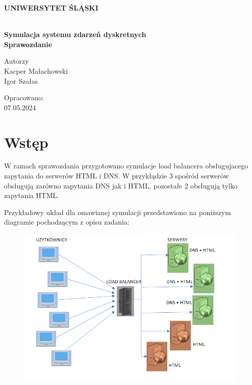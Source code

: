 \documentclass[12pt,oneside,a4paper]{book} %
\theoremstyle{break}
\begin{document}
\thispagestyle{empty}
\begin{center}
  \Large
  \bf{UNIWERSYTET ŚLĄSKI}\\
  \bf{}\\[25mm]
  \large

  \bf{Symulacja systemu zdarzeń dyskretnych}\\[35mm]

  Sprawozdanie\\[25mm]
\end{center}
\begin{flushright}
  \large
  Autorzy\\
  Kacper Małachowski\\
  Igor Szałas\\[25mm]
\end{flushright}
\begin{center}
  Opracowano:\\
  07.05.2024
\end{center}

\chapter*{Wstęp}

W ramach sprawozdania przygotowano symulacje load balancera obsługujacego zapytania do serwerów HTML i DNS.
W przykłądzie 3 spośród serwerów obsługują zarówno zapytania DNS jak i HTML, pozostałe 2 obsługują tylko zapytania HTML.

Przykładowy układ dla omawianej symulacji przedstawiono na poniższym diagramie pochodzącym z opisu zadania:

\begin{figure}[H]
  \centering
  \includegraphics[width=\textwidth]{chart-exercise.png}
\end{figure}
\end{document}
